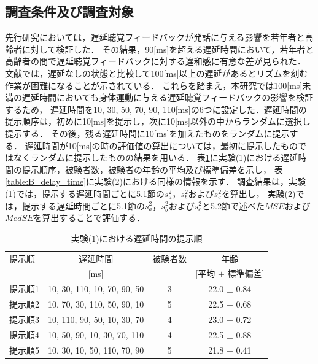 \subsection{調査条件及び調査対象}
\label{subsec:Yobi-conditions}
先行研究\cite{kayama}においては，遅延聴覚フィードバックが発話に与える影響を若年者と高齢者に対して検証した．
その結果，90[ms]を超える遅延時間において，若年者と高齢者の間で遅延聴覚フィードバックに対する違和感に有意な差が見られた．
文献\cite{timing-music}では，遅延なしの状態と比較して100[ms]以上の遅延があるとリズムを刻む作業が困難になることが示されている．
これらを踏まえ，本研究では100[ms]未満の遅延時間においても身体運動に与える遅延聴覚フィードバックの影響を検証するため，
遅延時間を10, 30, 50, 70, 90, 110[ms]の6つに設定した．遅延時間の提示順序は，初めに10[ms]を提示し，次に10[ms]以外の中からランダムに選択し提示する．
その後，残る遅延時間に10[ms]を加えたものをランダムに提示する．
遅延時間が10[ms]の時の評価値の算出については，最初に提示したものではなくランダムに提示したものの結果を用いる．
表\ref{table:A_delay_time}に実験(1)における遅延時間の提示順序，被験者数，被験者の年齢の平均及び標準偏差を示し，
表\ref{table:B_delay_time}に実験(2)における同様の情報を示す．
調査結果は，実験(1)では，提示する遅延時間ごとに5.1節の$s^2_{a}$，$s^2_{b}$および$s^2_{c}$を算出し，
実験(2)では，提示する遅延時間ごとに5.1節の$s^2_{a}$，$s^2_{b}$および$s^2_{c}$と5.2節で述べた$MSE$および$MedSE$を算出することで評価する．
\begin{table}[tbp]
  \caption{実験(1)における遅延時間の提示順}
  \label{table:A_delay_time}
  \centering
  \begin{tabular}{lccc}
    \hline
    提示順 & 遅延時間 & 被験者数 & 年齢\\
    　& [ms] & & [平均 $\pm$ 標準偏差]\\
    \hline \hline
    提示順1  & 10, 30, 110, 10, 70, 90, 50  & 3 & 22.0 $\pm$ 0.84\\
    提示順2  & 10, 70, 30, 110, 50, 90, 10  & 5 & 22.5 $\pm$ 0.68\\
    提示順3  & 10, 110, 90, 50, 10, 30, 70  & 4 & 23.0 $\pm$ 0.72\\
    提示順4  & 10, 50, 90, 10, 30, 70, 110  & 4 & 22.5 $\pm$ 0.88\\
    提示順5  & 10, 30, 10, 50, 110, 70, 90  & 5 & 21.8 $\pm$ 0.41
\\
    \hline
  \end{tabular}
\end{table}

